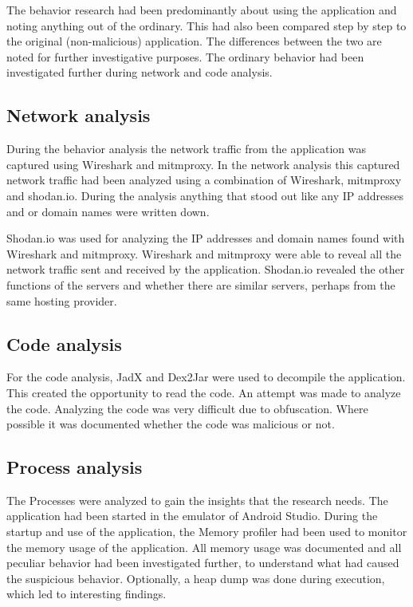 \documentclass{article}
\begin{document}
The behavior research had been predominantly about using the application and noting anything out of the ordinary. This had also been compared step by step to the original (non-malicious) application. The differences between the two are noted for further investigative purposes. The ordinary behavior had been investigated further during network and code analysis.

\subsection{Network analysis}

During the behavior analysis the network traffic from the application was captured using Wireshark and mitmproxy. In the network analysis this captured network traffic had been analyzed using a combination of Wireshark, mitmproxy and shodan.io. During the analysis anything that stood out like any IP addresses and or domain names were written down.

Shodan.io was used for analyzing the IP addresses and domain names found with Wireshark and mitmproxy. Wireshark and mitmproxy were able to reveal all the network traffic sent and received by the application. Shodan.io revealed the other functions of the servers and whether there are similar servers, perhaps from the same hosting provider.

\subsection{Code analysis}

For the code analysis, JadX and Dex2Jar were used to decompile the application. This created the opportunity to read the code. An attempt was made to analyze the code. Analyzing the code was very difficult due to obfuscation. Where possible it was documented whether the code was malicious or not.

\subsection{Process analysis}
The Processes were analyzed to gain the insights that the research needs. The application had been started in the emulator of Android Studio. During the startup and use of the application, the Memory profiler had been used to monitor the memory usage of the application. All memory usage was documented and all peculiar behavior had been investigated further, to understand what had caused the suspicious behavior. Optionally, a heap dump was done during execution, which led to interesting findings.
\end{document}
